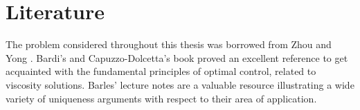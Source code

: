 \chapter*{Literature}

The problem considered throughout this thesis was borrowed from Zhou and Yong \cite{zhou}. Bardi's and Capuzzo-Dolcetta's book \cite{bardi2008optimal} proved an excellent reference to get acquainted with the fundamental principles of optimal control, related to viscosity solutions. Barles' lecture notes are a valuable resource illustrating a wide variety of uniqueness arguments with respect to their area of application.